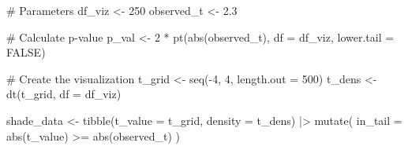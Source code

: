 \documentclass[
  letterpaper,
  DIV=11,
  numbers=noendperiod]{scrreprt}
\newenvironment{Shaded}{\begin{snugshade}}{\end{snugshade}}
\newcommand{\AttributeTok}[1]{\textcolor[rgb]{0.40,0.45,0.13}{#1}}
\newcommand{\CommentTok}[1]{\textcolor[rgb]{0.37,0.37,0.37}{#1}}
\newcommand{\ConstantTok}[1]{\textcolor[rgb]{0.56,0.35,0.01}{#1}}
\newcommand{\DecValTok}[1]{\textcolor[rgb]{0.68,0.00,0.00}{#1}}
\newcommand{\FloatTok}[1]{\textcolor[rgb]{0.68,0.00,0.00}{#1}}
\newcommand{\FunctionTok}[1]{\textcolor[rgb]{0.28,0.35,0.67}{#1}}
\newcommand{\NormalTok}[1]{\textcolor[rgb]{0.00,0.23,0.31}{#1}}
\newcommand{\OtherTok}[1]{\textcolor[rgb]{0.00,0.23,0.31}{#1}}
\newcommand{\SpecialCharTok}[1]{\textcolor[rgb]{0.37,0.37,0.37}{#1}}
\begin{document}
\begin{Shaded}
\begin{Highlighting}[]
\CommentTok{\# Parameters}
\NormalTok{df\_viz }\OtherTok{\textless{}{-}} \DecValTok{250}
\NormalTok{observed\_t }\OtherTok{\textless{}{-}} \FloatTok{2.3}

\CommentTok{\# Calculate p{-}value}
\NormalTok{p\_val }\OtherTok{\textless{}{-}} \DecValTok{2} \SpecialCharTok{*} \FunctionTok{pt}\NormalTok{(}\FunctionTok{abs}\NormalTok{(observed\_t), }\AttributeTok{df =}\NormalTok{ df\_viz, }\AttributeTok{lower.tail =} \ConstantTok{FALSE}\NormalTok{)}

\CommentTok{\# Create the visualization}
\NormalTok{t\_grid }\OtherTok{\textless{}{-}} \FunctionTok{seq}\NormalTok{(}\SpecialCharTok{{-}}\DecValTok{4}\NormalTok{, }\DecValTok{4}\NormalTok{, }\AttributeTok{length.out =} \DecValTok{500}\NormalTok{)}
\NormalTok{t\_dens }\OtherTok{\textless{}{-}} \FunctionTok{dt}\NormalTok{(t\_grid, }\AttributeTok{df =}\NormalTok{ df\_viz)}

\NormalTok{shade\_data }\OtherTok{\textless{}{-}} \FunctionTok{tibble}\NormalTok{(}\AttributeTok{t\_value =}\NormalTok{ t\_grid, }\AttributeTok{density =}\NormalTok{ t\_dens) }\SpecialCharTok{|\textgreater{}}
  \FunctionTok{mutate}\NormalTok{(}
    \AttributeTok{in\_tail =} \FunctionTok{abs}\NormalTok{(t\_value) }\SpecialCharTok{\textgreater{}=} \FunctionTok{abs}\NormalTok{(observed\_t)}
\NormalTok{  )}


\end{Highlighting}
\end{Shaded}
\end{document}
